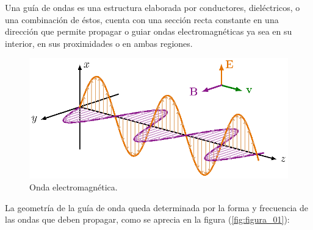 Una guía de ondas es una estructura elaborada por conductores, dieléctricos, o una combinación de éstos, cuenta con una sección recta constante en una dirección que permite propagar o guiar ondas electromagnéticas ya sea en su interior, en sus proximidades o en ambas regiones.
\begin{figure}[H]
    \centering
    \includegraphics[scale=1]{Imagenes/Onda_Electromagnetica.eps}
    \caption{Onda electromagnética.}
\end{figure}
La geometría de la guía de onda queda determinada por la forma y frecuencia de las ondas que deben propagar, como se aprecia en la figura (\ref{fig:figura_01}):

